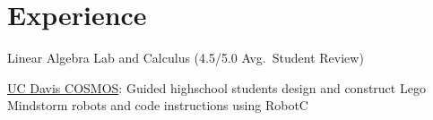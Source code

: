 \documentclass[letterpaper]{deedy-resume} %
\begin{document}
\begin{minipage}[t]{0.66\textwidth} %


\section{Experience}






\vspace{\topsep} %

\setmainfont[Path = fonts/lato/,BoldItalicFont=Lato-RegIta,BoldFont=Lato-Reg,ItalicFont=Lato-LigIta]{Lato-Lig}
{\color{black}\begin{tightitemize}
    \item Linear Algebra Lab and Calculus (4.5/5.0 Avg.~Student Review)
    \item \href{http://cosmos.ucdavis.edu}{UC Davis COSMOS}: Guided highschool students design and construct Lego Mindstorm robots and code instructions using RobotC
\end{tightitemize}}
\setmainfont[Color=primary, Path = fonts/lato/]{Lato-Lig}

\vspace{4pt}


\end{minipage}
\end{document}
